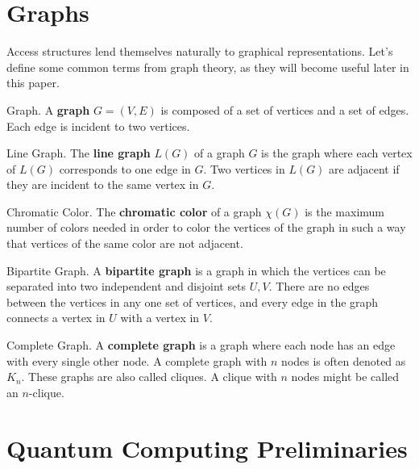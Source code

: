 \section{Graphs}
\label{sec:graphs}

Access structures lend themselves naturally to graphical representations. Let's define some common terms from graph theory, as they will become useful later in this paper. 

\begin{definition}{Graph.}
    \label{defn:graph}
    A \textbf{graph} $G=(V,E)$ is composed of a set of vertices and a set of edges. Each edge is incident to two vertices.
\end{definition}

\begin{definition}{Line Graph.}
    \label{defn:line-graph}
    The \textbf{line graph} $L(G)$ of a graph $G$ is the graph where each vertex of $L(G)$ corresponds to one edge in $G$. Two vertices in $L(G)$ are adjacent if they are incident to the same vertex in $G$. 
\end{definition}

\begin{definition}{Chromatic Color.}
    \label{defn:colors}
	The \textbf{chromatic color} of a graph $\chi(G)$ is the maximum number of colors needed in order to color the vertices of the graph in such a way that vertices of the same color are not adjacent.
\end{definition}

\begin{definition}{Bipartite Graph.}
    \label{defn:bipartite}
	A \textbf{bipartite graph} is a graph in which the vertices can be separated into two independent and disjoint sets $U,V$. There are no edges between the vertices in any one set of vertices, and every edge in the graph connects a vertex in $U$ with a vertex in $V$.
\end{definition}

\begin{definition}{Complete Graph.}
    \label{defn:clique}
    A \textbf{complete graph} is a graph where each node has an edge with every single other node. A complete graph with $n$ nodes is often denoted as $K_n$. These graphs are also called cliques. A clique with $n$ nodes might be called an $n$-clique.
\end{definition}

\section{Quantum Computing Preliminaries}
\label{sec:qc}

